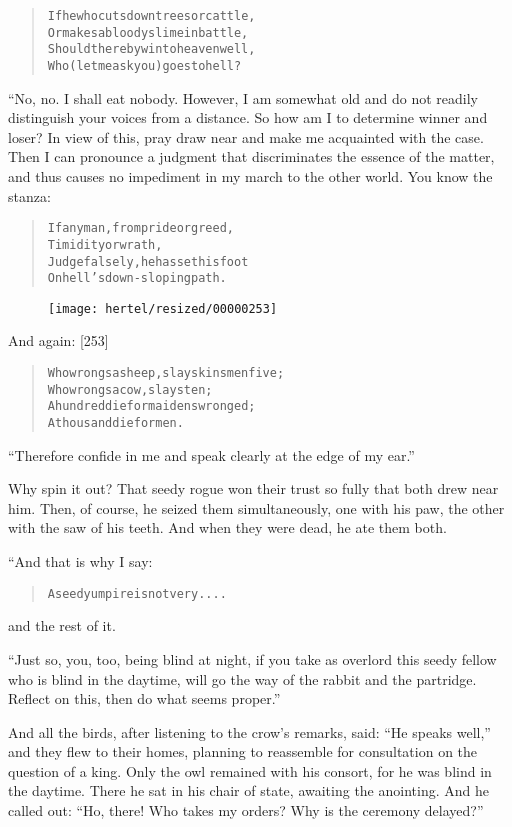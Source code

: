 \documentclass[article, twoside, 10pt]{memoir}
\renewenvironment{verbatim}{%
\begin{quote}%
\vskip -10pt%
\begin{alltt}\normalfont\small}{\end{alltt}%
\end{quote}%
\vskip -10pt
} %
\begin{document}
\begin{verbatim}
If he who cuts down trees or cattle,
Or makes a bloody slime in battle,
Should thereby win to heaven{\textemdash}well,
Who (let me ask you) goes to hell?
\end{verbatim}
“No, no. I shall eat nobody. However, I am somewhat old and do not
readily distinguish your voices from a distance. So how am I to
determine winner and loser? In view of this, pray draw near and
make me acquainted with the case. Then I can pronounce a judgment
that discriminates the essence of the matter, and thus causes no
impediment in my march to the other world. You know the stanza:

\begin{verbatim}
If any man, from pride or greed,
    Timidity or wrath,
Judge falsely, he has set his foot
    On hell's down-sloping path.
\end{verbatim}
\begin{figure}[p]\texttt{[image: hertel/resized/00000253]}\end{figure}And again: [253]

\begin{verbatim}
Who wrongs a sheep, slays kinsmen five;
    Who wrongs a cow, slays ten;
A hundred die for maidens wronged;
    A thousand die for men.
\end{verbatim}
``Therefore confide in me and speak clearly at the edge of my ear.''

Why spin it out? That seedy rogue won their trust so fully that
both drew near him. Then, of course, he seized them simultaneously,
one with his paw, the other with the saw of his teeth. And when
they were dead, he ate them both.

“And that is why I say:

\begin{verbatim}
A seedy umpire is not very. . . .
\end{verbatim}
and the rest of it.

``Just so, you, too, being blind at night, if you take as overlord this seedy fellow who is blind in the daytime, will go the way of the rabbit and the partridge. Reflect on this, then do what seems proper.''

And all the birds, after listening to the crow's remarks, said:
``He speaks well,'' and they flew to their homes, planning to
reassemble for consultation on the question of a king. Only the owl
remained with his consort, for he was blind in the daytime. There
he sat in his chair of state, awaiting the anointing. And he called
out:
``Ho, there! Who takes my orders? Why is the ceremony delayed?''
\end{document}
